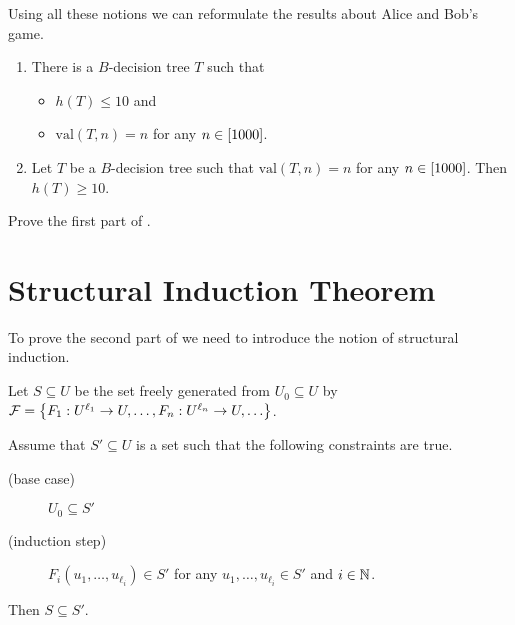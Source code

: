 Using all these notions we can reformulate the results about Alice and Bob's
game.
\begin{theorem}
\label{theorem:guess-the-number}
  \begin{enumerate}
    \item There is a $B$-decision tree $T$ such that
      \begin{itemize}
        \item $h(T) \le 10$ and
        \item $\mathrm{val}(T, n) = n$ for any $n \in {[{1000}]}$.
      \end{itemize}
    \item Let $T$ be a $B$-decision tree such that $\mathrm{val}(T, n) = n$ for
      any $n \in {[{1000}]}$. Then $h(T) \ge 10$.
  \end{enumerate}
\end{theorem}

\begin{exercise}
  Prove the first part of .
\end{exercise}

\section{Structural Induction Theorem}
To prove the second part of  we need
to introduce the notion of structural induction.

\begin{theorem}
\label{theorem:structural-induction}
    Let $S \subseteq U$ be the set freely generated from $U_0 \subseteq U$ by
    $\mathcal{F} =
      \set{F_1 : U^{\ell_1} \to U, \dots, F_n : U^{\ell_n} \to U, \dots }$.

    Assume that $S' \subseteq U$ is a set such that the following constraints
    are true.
    \begin{description}
        \item [(base case)] $U_0 \subseteq S'$
        \item[(induction step)]
          $F_i(u_1, \dots, u_{\ell_i}) \in S'$ for any
          $u_1, \dots, u_{\ell_i} \in S'$ and $i \in {\mathbb{N}}$.
    \end{description}
    Then $S \subseteq S'$.
\end{theorem}

